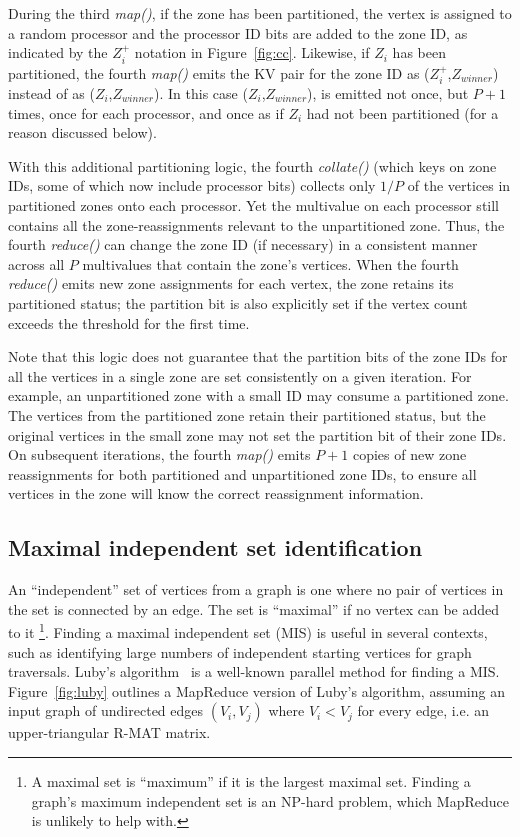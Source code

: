 During the third {\it map()}, if the zone has been partitioned, the
vertex is assigned to a random processor and the processor ID bits are
added to the zone ID, as indicated by the $Z_i^+$ notation in
Figure~\ref{fig:cc}.  Likewise, if $Z_i$ has been partitioned, the
fourth {\it map()} emits the KV pair for the zone ID as
($Z_i^+$,$Z_{winner}$) instead of as ($Z_i$,$Z_{winner}$).  In this
case ($Z_i$,$Z_{winner}$), is emitted not once, but $P+1$ times, once
for each processor, and once as if $Z_i$ had not been partitioned (for
a reason discussed below).

With this additional partitioning logic, the fourth {\it collate()}
(which keys on zone IDs, some of which now include processor bits)
collects only $1/P$ of the vertices in partitioned zones onto each
processor.  Yet the multivalue on each processor still contains all
the zone-reassignments relevant to the unpartitioned zone.  Thus, the
fourth {\it reduce()} can change the zone ID (if necessary) in a
consistent manner across all $P$ multivalues that contain the zone's
vertices.  When the fourth {\it reduce()} emits new zone assignments
for each vertex, the zone retains its partitioned status; the
partition bit is also explicitly set if the vertex count exceeds the
threshold for the first time.

Note that this logic does not guarantee that the partition bits of the
zone IDs for all the vertices in a single zone are set consistently on
a given iteration.  For example, an unpartitioned zone with a small ID
may consume a partitioned zone.  The vertices from the partitioned
zone retain their partitioned status, but the original vertices in the
small zone may not set the partition bit of their zone IDs.  On
subsequent iterations, the fourth {\it map()} emits $P+1$ copies of
new zone reassignments for both partitioned and unpartitioned zone
IDs, to ensure all vertices in the zone will know the correct
reassignment information.

\subsection{Maximal independent set identification}

An ``independent'' set of vertices from a graph is one where no pair
of vertices in the set is connected by an edge.  The set is
``maximal'' if no vertex can be added to it \footnote{A maximal set is
``maximum'' if it is the largest maximal set.  Finding a graph's
maximum independent set is an NP-hard problem, which MapReduce is
unlikely to help with.}.  Finding a maximal independent set (MIS) is
useful in several contexts, such as identifying large numbers of
independent starting vertices for graph traversals.  Luby's
algorithm~\cite{Luby86} is a well-known parallel method for finding a
MIS.  Figure~\ref{fig:luby} outlines a MapReduce version of Luby's
algorithm, assuming an input graph of undirected edges $(V_i,V_j)$
where $V_i < V_j$ for every edge, i.e. an upper-triangular R-MAT
matrix.

